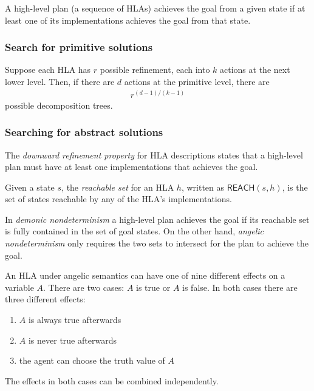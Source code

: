 \documentclass{article}
\begin{document}
\begin{definition}
    A high-level plan (a sequence of HLAs) achieves the goal from a given state
    if at least one of its implementations achieves the goal from that state.
\end{definition}

\subsubsection{Search for primitive solutions}

\begin{theorem}
    Suppose each HLA has $r$ possible refinement, each into $k$ actions at the
    next lower level. Then, if there are $d$ actions at the primitive level,
    there are
    \begin{align*}
        r^{(d-1)/(k-1)}
    \end{align*}
    possible decomposition trees.
\end{theorem}

\subsubsection{Searching for abstract solutions}

\begin{definition}
    The \emph{downward refinement property} for HLA descriptions states that
    a high-level plan must have at least one implementations that achieves the
    goal.
\end{definition}

\begin{definition}
    Given a state $s$, the \emph{reachable set} for an HLA $h$, written as
    $\textsf{REACH}(s,h)$, is the set of states reachable by any of the HLA's
    implementations.
\end{definition}

\begin{definition}
    In \emph{demonic nondeterminism} a high-level plan achieves the goal if
    its reachable set is fully contained in the set of goal states.
    On the other hand, \emph{angelic nondeterminism} only requires the two
    sets to intersect for the plan to achieve the goal.
\end{definition}

\begin{theorem}
    An HLA under angelic semantics can have one of nine different effects on
    a variable $A$. There are two cases: $A$ is true or $A$ is false. In both
    cases there are three different effects:
    \begin{enumerate}
        \item $A$ is always true afterwards
        \item $A$ is never true afterwards
        \item the agent can choose the truth value of $A$
    \end{enumerate}
    The effects in both cases can be combined independently.
\end{theorem}
\end{document}

